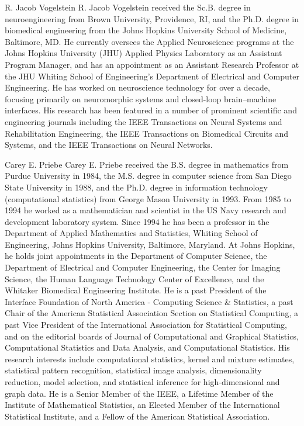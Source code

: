 \documentclass[10pt,journal,cspaper,compsoc]{IEEEtran}
\begin{document}

\begin{IEEEbiographynophoto}{R. Jacob Vogelstein}
R. Jacob Vogelstein received the Sc.B. degree in neuroengineering from Brown University, Providence, RI, and the Ph.D. degree in biomedical engineering from the Johns Hopkins University School of Medicine, Baltimore, MD.  He currently oversees the Applied Neuroscience programs at the Johns Hopkins University (JHU) Applied Physics Laboratory as an Assistant Program Manager, and has an appointment as an Assistant Research Professor at the JHU Whiting School of Engineering’s Department of Electrical and Computer Engineering. He has worked on neuroscience technology for over a decade, focusing primarily on neuromorphic systems and closed-loop brain–machine interfaces. His research has been featured in a number of prominent scientific and engineering journals including the IEEE Transactions on Neural Systems and Rehabilitation Engineering, the IEEE Transactions on Biomedical Circuits and Systems, and the IEEE Transactions on Neural Networks.  
\end{IEEEbiographynophoto}

\begin{IEEEbiographynophoto}{Carey E. Priebe}
Carey E. Priebe received the B.S. degree in mathematics from Purdue University in 1984, the M.S. degree in computer science from San Diego State University in 1988, and the Ph.D. degree in information technology (computational statistics) from George Mason University in 1993. From 1985 to 1994 he worked as a mathematician and scientist in the US Navy research and development laboratory system. Since 1994 he has been a professor in the Department of Applied Mathematics and Statistics, Whiting School of Engineering, Johns Hopkins University, Baltimore, Maryland. At Johns Hopkins, he holds joint appointments in the Department of Computer Science, the Department of Electrical and Computer Engineering, the Center for Imaging Science, the Human Language Technology Center of Excellence, and the Whitaker Biomedical Engineering Institute. He is a past President of the Interface Foundation of North America - Computing Science \& Statistics, a past Chair of the American Statistical Association Section on Statistical Computing, a past Vice President of the International Association for Statistical Computing, and on the editorial boards of Journal of Computational and Graphical Statistics, Computational Statistics and Data Analysis, and Computational Statistics. His research interests include computational statistics, kernel and mixture estimates, statistical pattern recognition, statistical image analysis, dimensionality reduction, model selection, and statistical inference for high-dimensional and graph data. He is a Senior Member of the IEEE, a Lifetime Member of the Institute of Mathematical Statistics, an Elected Member of the International Statistical Institute, and a Fellow of the American Statistical Association.
\end{IEEEbiographynophoto}

\end{document}
